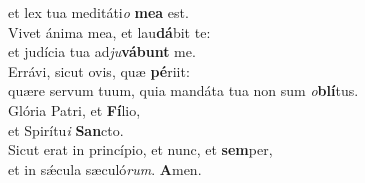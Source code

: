 \evenverse et lex tua meditáti\textit{o} \textbf{me}\textbf{a} est.\\
\oddverse Vivet ánima mea, et lau\textbf{dá}bit te:~\*\\
\oddverse et judícia tua ad\textit{ju}\textbf{vá}\textbf{bunt} me.\\
\evenverse Errávi, sicut ovis, quæ \textbf{pé}riit:~\*\\
\evenverse quære servum tuum, quia mandáta tua non sum \textit{o}\textbf{blí}tus.\\
\oddverse Glória Patri, et \textbf{Fí}lio,~\*\\
\oddverse et Spirítu\textit{i} \textbf{San}cto.\\
\evenverse Sicut erat in princípio, et nunc, et \textbf{sem}per,~\*\\
\evenverse et in sǽcula sæculó\textit{rum}. \textbf{A}men.\\
